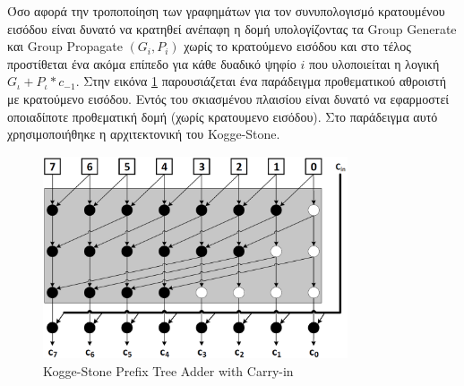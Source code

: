 Όσο αφορά την τροποποίηση των γραφημάτων για τον συνυπολογισμό κρατουμένου εισόδου
είναι δυνατό να κρατηθεί ανέπαφη η δομή υπολογίζοντας τα Group Generate και Group Propagate 
$(G_i,P_i)$ χωρίς το κρατούμενο εισόδου  και στο τέλος προστίθεται ένα ακόμα επίπεδο
για κάθε δυαδικό ψηφίο $i$ που υλοποιείται η λογική $G_ι + P_ι*c_{-1}$.
Στην εικόνα \ref{Kogge-StoneTree_with_carry_in} παρουσιάζεται ένα παράδειγμα προθεματικού αθροιστή
με κρατούμενο εισόδου. Εντός του σκιασμένου πλαισίου είναι δυνατό να εφαρμοστεί οποιαδίποτε 
προθεματική δομή (χωρίς κρατουμενο εισόδου). Στο παράδειγμα αυτό χρησιμοποιήθηκε η 
αρχιτεκτονική του Kogge-Stone.
\begin{figure}[H]
    \centering
    \includegraphics[height=6cm,width=9cm]{Pictures/Kogge-stone_with_carry_in.png}
    \caption{Kogge-Stone Prefix Tree Adder with Carry-in}
    \label{Kogge-StoneTree_with_carry_in}
\end{figure}

